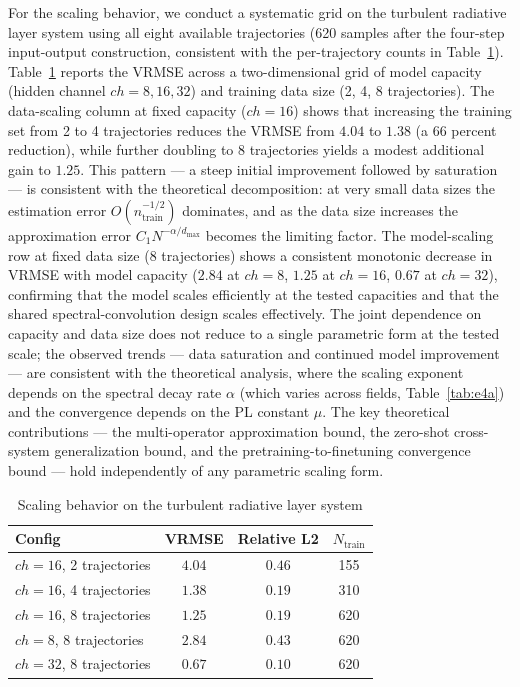 \documentclass[preprint,12pt]{elsarticle}
\begin{document}
For the scaling behavior, we conduct a systematic grid on the turbulent radiative layer system using all eight available trajectories (620 samples after the four-step input-output construction, consistent with the per-trajectory counts in Table~\ref{tab:m8}). Table~\ref{tab:m8} reports the VRMSE across a two-dimensional grid of model capacity (hidden channel $ch=8,16,32$) and training data size (2, 4, 8 trajectories). The data-scaling column at fixed capacity ($ch=16$) shows that increasing the training set from 2 to 4 trajectories reduces the VRMSE from $4.04$ to $1.38$ (a 66 percent reduction), while further doubling to 8 trajectories yields a modest additional gain to $1.25$. This pattern --- a steep initial improvement followed by saturation --- is consistent with the theoretical decomposition: at very small data sizes the estimation error $O(n_{\mathrm{train}}^{-1/2})$ dominates, and as the data size increases the approximation error $C_1 N^{-\alpha/d_{\max}}$ becomes the limiting factor. The model-scaling row at fixed data size (8 trajectories) shows a consistent monotonic decrease in VRMSE with model capacity ($2.84$ at $ch=8$, $1.25$ at $ch=16$, $0.67$ at $ch=32$), confirming that the model scales efficiently at the tested capacities and that the shared spectral-convolution design scales effectively. The joint dependence on capacity and data size does not reduce to a single parametric form at the tested scale; the observed trends --- data saturation and continued model improvement --- are consistent with the theoretical analysis, where the scaling exponent depends on the spectral decay rate $\alpha$ (which varies across fields, Table~\ref{tab:e4a}) and the convergence depends on the PL constant $\mu$. The key theoretical contributions --- the multi-operator approximation bound, the zero-shot cross-system generalization bound, and the pretraining-to-finetuning convergence bound --- hold independently of any parametric scaling form.

\begin{table}[t]
\centering
\small
\caption{Scaling behavior on the turbulent radiative layer system}
\label{tab:m8}
\begin{tabular}{lccc}
\toprule
Config & VRMSE & Relative L2 & $N_{\mathrm{train}}$ \\
\midrule
$ch=16$, 2 trajectories & $4.04$ & $0.46$ & 155 \\
$ch=16$, 4 trajectories & $1.38$ & $0.19$ & 310 \\
$ch=16$, 8 trajectories & $1.25$ & $0.19$ & 620 \\
$ch=8$, 8 trajectories & $2.84$ & $0.43$ & 620 \\
$ch=32$, 8 trajectories & $0.67$ & $0.10$ & 620 \\
\bottomrule
\end{tabular}
\end{table}
\end{document}

